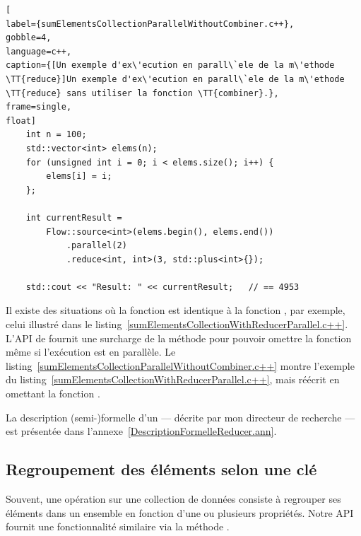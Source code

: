 \begin{lstlisting}[
label={sumElementsCollectionParallelWithoutCombiner.c++},
gobble=4,
language=c++,
caption={[Un exemple d'ex\'ecution en parall\`ele de la m\'ethode \TT{reduce}]Un exemple d'ex\'ecution en parall\`ele de la m\'ethode \TT{reduce} sans utiliser la fonction \TT{combiner}.},
frame=single,
float]
    int n = 100;
    std::vector<int> elems(n);
    for (unsigned int i = 0; i < elems.size(); i++) {
        elems[i] = i;
    };

	int currentResult =
		Flow::source<int>(elems.begin(), elems.end())
            .parallel(2)
            .reduce<int, int>(3, std::plus<int>{}); 
	
	std::cout << "Result: " << currentResult;	// == 4953
\end{lstlisting}



Il existe des situations o\`u la fonction  est identique à la fonction , par exemple, celui illustr\'e dans le listing~\ref{sumElementsCollectionWithReducerParallel.c++}. L'API de  fournit une surcharge de la m\'ethode  pour pouvoir omettre la fonction  m\^eme si l'ex\'ecution est en parall\`ele. Le listing~\ref{sumElementsCollectionParallelWithoutCombiner.c++} montre l'exemple du listing~\ref{sumElementsCollectionWithReducerParallel.c++}, mais r\'e\'ecrit en omettant la fonction . 




La description (semi-)formelle d'un  --- d\'ecrite par mon directeur de recherche --- est pr\'esent\'ee dans l'annexe~\ref{DescriptionFormelleReducer.ann}.



\subsection{Regroupement des \'el\'ements selon une cl\'e}

Souvent, une op\'eration sur une collection de donn\'ees consiste \`a regrouper ses \'el\'ements dans un ensemble en fonction d'une ou plusieurs propri\'et\'es. Notre {API} fournit une fonctionnalit\'e similaire via la m\'ethode .


